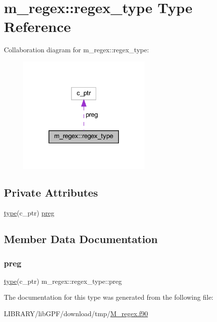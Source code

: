 \hypertarget{structm__regex_1_1regex__type}{}\section{m\+\_\+regex\+:\+:regex\+\_\+type Type Reference}
\label{structm__regex_1_1regex__type}


Collaboration diagram for m\+\_\+regex\+:\+:regex\+\_\+type\+:
\nopagebreak
\begin{figure}[H]
\begin{center}
\leavevmode
\includegraphics[width=188pt]{structm__regex_1_1regex__type__coll__graph}
\end{center}
\end{figure}
\subsection*{Private Attributes}
\begin{DoxyCompactItemize}
\item 
\hyperlink{stop__watch_83_8txt_a70f0ead91c32e25323c03265aa302c1c}{type}(c\+\_\+ptr) \hyperlink{structm__regex_1_1regex__type_a850ec0fd2a7423bb33119ff8f95cb38c}{preg}
\end{DoxyCompactItemize}


\subsection{Member Data Documentation}
\mbox{\label{structm__regex_1_1regex__type_a850ec0fd2a7423bb33119ff8f95cb38c}} 
\subsubsection{\texorpdfstring{preg}{preg}}
{\footnotesize\ttfamily \hyperlink{stop__watch_83_8txt_a70f0ead91c32e25323c03265aa302c1c}{type}(c\+\_\+ptr) m\+\_\+regex\+::regex\+\_\+type\+::preg\hspace{0.3cm}{\ttfamily [private]}}



The documentation for this type was generated from the following file\+:\begin{DoxyCompactItemize}
\item 
L\+I\+B\+R\+A\+R\+Y/lib\+G\+P\+F/download/tmp/\hyperlink{M__regex_8f90}{M\+\_\+regex.\+f90}\end{DoxyCompactItemize}

